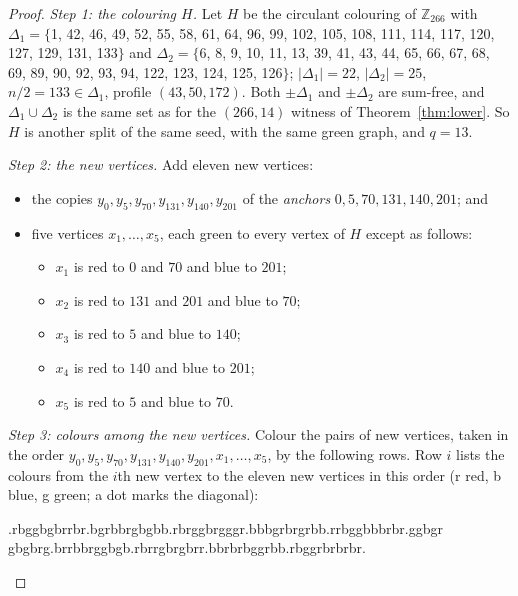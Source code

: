 \documentclass[11pt]{article}
\theoremstyle{spacedplain}
\theoremstyle{spaceddef}
\theoremstyle{spacedremark}
\begin{document}
\begin{proof}
\emph{Step 1: the colouring $H$.}
Let $H$ be the circulant colouring of $\mathbb Z_{266}$ with $\Delta_1=\{$1, 42, 46, 49, 52, 55, 58, 61, 64, 96, 99, 102, 105, 108, 111, 114, 117, 120, 127, 129, 131, 133$\}$ and $\Delta_2=\{$6, 8, 9, 10, 11, 13, 39, 41, 43, 44, 65, 66, 67, 68, 69, 89, 90, 92, 93, 94, 122, 123, 124, 125, 126$\}$; $|\Delta_1|=22$, $|\Delta_2|=25$, $n/2=133\in\Delta_1$, profile $(43,50,172)$.
Both $\pm\Delta_1$ and $\pm\Delta_2$ are sum-free, and $\Delta_1\cup\Delta_2$ is the same set as for the $(266,14)$ witness of Theorem~\ref{thm:lower}.
So $H$ is another split of the same seed, with the same green graph, and $q=13$.

\emph{Step 2: the new vertices.}
Add eleven new vertices:
\begin{itemize}
\item the copies $y_0,y_5,y_{70},y_{131},y_{140},y_{201}$ of the \emph{anchors} $0,5,70,131,140,201$; and
\item five vertices $x_1,\dots,x_5$, each green to every vertex of $H$ except as follows:
\begin{itemize}
\item $x_1$ is red to $0$ and $70$ and blue to $201$;
\item $x_2$ is red to $131$ and $201$ and blue to $70$;
\item $x_3$ is red to $5$ and blue to $140$;
\item $x_4$ is red to $140$ and blue to $201$;
\item $x_5$ is red to $5$ and blue to $70$.
\end{itemize}
\end{itemize}

\noindent\begin{minipage}{\linewidth}
\emph{Step 3: colours among the new vertices.}
Colour the pairs of new vertices, taken in the order $y_0,y_5,y_{70},y_{131},y_{140},y_{201},x_1,\dots,x_5$, by the following rows.
Row $i$ lists the colours from the $i$th new vertex to the eleven new vertices in this order (r red, b blue, g green; a dot marks the diagonal):
\begin{center}\small\ttfamily
.rbggbgbrrb\quad r.bgrbbrgbg\quad bb.rbrggbrg\quad ggr.bbbgrbr\quad grbb.rrbggb\quad bbrbr.ggbgr\\
gbgbrg.brrb\quad brggbgb.rbr\quad rgbrgbrr.bb\quad rbrbggrbb.r\quad bggrbrbrbr.
\end{center}
\end{minipage}


\end{proof}
\end{document}
